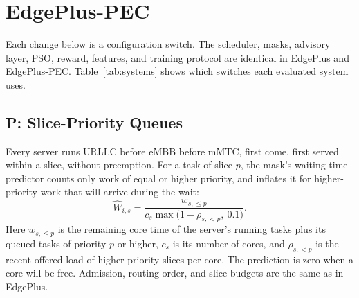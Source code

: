 \documentclass[11pt,journal,onecolumn]{IEEEtran}
\begin{document}
\section{EdgePlus-PEC}
\label{sec:pec}

Each change below is a configuration switch. The scheduler, masks, advisory layer, PSO, reward, features, and training protocol are identical in EdgePlus and EdgePlus-PEC. Table~\ref{tab:systems} shows which switches each evaluated system uses.

\subsection{P: Slice-Priority Queues}
\label{sec:pec-p}
Every server runs URLLC before eMBB before mMTC, first come, first served within a slice, without preemption. For a task of slice $p$, the mask's waiting-time predictor counts only work of equal or higher priority, and inflates it for higher-priority work that will arrive during the wait:
\begin{equation}
\hat W_{i,s} = \frac{w_{s,\le p}}{c_s \max\bigl(1 - \rho_{s,<p},\ 0.1\bigr)} .
\label{eq:priority}
\end{equation}
Here $w_{s,\le p}$ is the remaining core time of the server's running tasks plus its queued tasks of priority $p$ or higher, $c_s$ is its number of cores, and $\rho_{s,<p}$ is the recent offered load of higher-priority slices per core. The prediction is zero when a core will be free. Admission, routing order, and slice budgets are the same as in EdgePlus.
\end{document}
